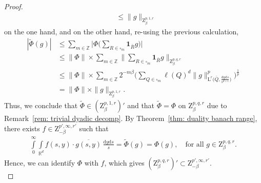 \documentclass[10pt,a4paper]{amsart}
\newcommand{\IR}{\mathbb{R}}
\newcommand{\IZ}{\mathbb{Z}}
\renewcommand{\L}{\mathrm{L}}
\newcommand{\Z}{\mathrm{Z}}
\renewcommand{\d}{\mathrm{d}}
\begin{document}
\begin{proof}
\begin{align*}
        &\leq \|g\|_{\Z^{p,1,r}_\beta}
    \end{align*}
    on the one hand, and on the other hand, re-using the previous calculation,
    \begin{align*}
        |\tilde \Phi (g)|&\leq  \sum\limits_{m\in\IZ} \Big|\Phi\Big(\sum\limits_{R\in\square_m} \mathbf{1}_{\bar R}g \Big)\Big|\\
        &\leq \|\Phi\| \times \sum\limits_{m\in\IZ}
        \Big\|\sum\limits_{R\in\square_m} \mathbf{1}_{\bar R}g  \Big\|_{\Z^{p,q,r}_\beta}\\
        &\leq  \|\Phi\| \times \sum\limits_{m\in\IZ} 2^{-m\beta } \Big(\sum\limits_{Q\in\square_m} \ell(Q)^d \|g\|_{\L^r\big(\bar Q, \frac{\d y \d s}{s^{d+1}}\big)}^p\Big)^\frac{1}{p}\\
        &= \|\Phi\| \times\|g\|_{\Z^{p,1,r}_\beta}.
    \end{align*}
    Thus, we conclude that $\tilde \Phi \in (\Z^{p,1,r}_\beta)'$ and that $\tilde \Phi = \Phi$ on $\Z^{p,q,r}_\beta$ due to Remark~\ref{rem: trivial dyadic decomp}. By Theorem~\ref{thm: duality banach range}, there exists $f \in \Z^{p',\infty,r'}_{-\beta}$ such that
    \begin{align*}
        \int\limits_{0}^\infty\int\limits_{\IR^d} f(s,y) \cdot \overline{g(s,y)} \,\frac{\d y \d s}{s} = \tilde \Phi(g) = \Phi(g),\quad \text{for all $g \in \Z^{p,q,r}_\beta$.}
    \end{align*}
    Hence, we can identify $\Phi$ with $f$, which gives $(\Z^{p,q,r}_\beta)' \subset  \Z^{p',\infty,r'}_{-\beta}$.\\


\end{proof}
\end{document}
